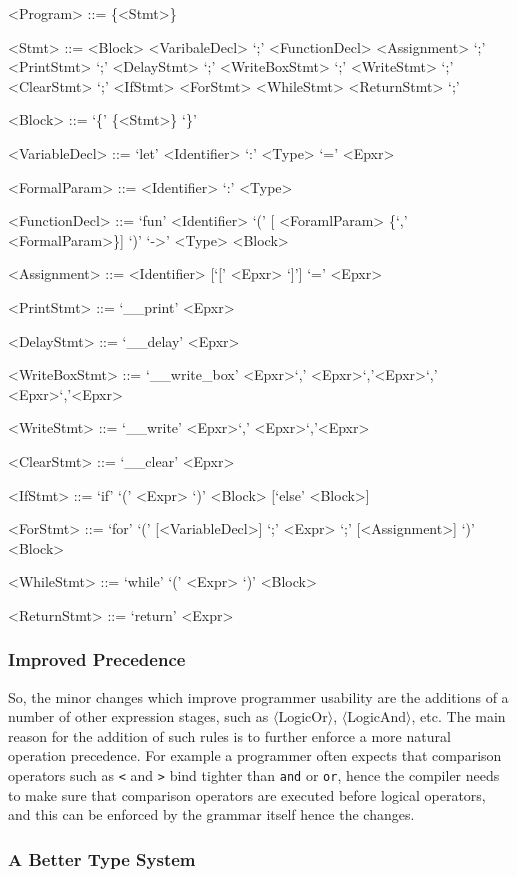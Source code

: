 \begin{center}
\begin{grammar}
<Program> ::= \{<Stmt>\}

<Stmt> ::= <Block>
\alt <VaribaleDecl> `;'
\alt <FunctionDecl>
\alt <Assignment> `;'
\alt <PrintStmt> `;'
\alt <DelayStmt> `;'
\alt <WriteBoxStmt> `;'
\alt <WriteStmt> `;'
\alt <ClearStmt> `;'
\alt <IfStmt>
\alt <ForStmt>
\alt <WhileStmt>
\alt <ReturnStmt> `;'

<Block> ::= `\{' \{<Stmt>\} `\}'

<VariableDecl> ::= `let' <Identifier> `:' <Type> `='
<Epxr>

<FormalParam> ::= <Identifier> `:' <Type>

<FunctionDecl> ::= `fun' <Identifier> `(' [ <ForamlParam>
\{`,' <FormalParam>\}] `)' `->' <Type> <Block>

<Assignment> ::= <Identifier> [`[' <Epxr> `]'] `='
<Epxr>

<PrintStmt> ::= `\_\_print' <Epxr>

<DelayStmt> ::= `\_\_delay' <Epxr>

<WriteBoxStmt> ::= `\_\_write\_box' <Epxr>`,'
<Epxr>`,'<Epxr>`,' <Epxr>`,'<Epxr>

<WriteStmt> ::= `\_\_write' <Epxr>`,' <Epxr>`,'<Epxr>

<ClearStmt> ::= `\_\_clear' <Epxr>

<IfStmt> ::= `if' `(' <Expr> `)' <Block> [`else' <Block>]

<ForStmt> ::= `for' `(' [<VariableDecl>] `;' <Expr> `;'
[<Assignment>] `)' <Block>

<WhileStmt> ::= `while' `(' <Expr> `)' <Block>

<ReturnStmt> ::= `return' <Expr>
\end{grammar}
\end{center}

\subsubsection{Improved Precedence}

So, the minor changes which improve programmer usability are the
additions of a number of other expression stages, such as
$\langle$LogicOr$\rangle$, $\langle$LogicAnd$\rangle$, etc. The
main reason for the addition of such rules is to further enforce
a more natural operation precedence. For example a programmer
often expects that comparison operators such as \texttt{<} and
\texttt{>} bind tighter than \texttt{and} or \texttt{or}, hence
the compiler needs to make sure that comparison operators are
executed before logical operators, and this can be enforced by
the grammar itself hence the changes.

\subsubsection{A Better Type System}



